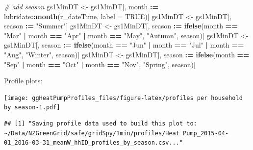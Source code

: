 \documentclass[]{article}
\newenvironment{Shaded}{\begin{snugshade}}{\end{snugshade}}
\newcommand{\KeywordTok}[1]{\textcolor[rgb]{0.13,0.29,0.53}{\textbf{#1}}}
\newcommand{\DataTypeTok}[1]{\textcolor[rgb]{0.13,0.29,0.53}{#1}}
\newcommand{\StringTok}[1]{\textcolor[rgb]{0.31,0.60,0.02}{#1}}
\newcommand{\CommentTok}[1]{\textcolor[rgb]{0.56,0.35,0.01}{\textit{#1}}}
\newcommand{\OtherTok}[1]{\textcolor[rgb]{0.56,0.35,0.01}{#1}}
\newcommand{\OperatorTok}[1]{\textcolor[rgb]{0.81,0.36,0.00}{\textbf{#1}}}
\newcommand{\ErrorTok}[1]{\textcolor[rgb]{0.64,0.00,0.00}{\textbf{#1}}}
\newcommand{\NormalTok}[1]{#1}
\begin{document}
\begin{Shaded}
\begin{Highlighting}[]
\CommentTok{# add season}
\NormalTok{gs1MinDT <-}\StringTok{ }\NormalTok{gs1MinDT[, month }\OperatorTok{:}\ErrorTok{=}\StringTok{ }\NormalTok{lubridate}\OperatorTok{::}\KeywordTok{month}\NormalTok{(r_dateTime, }\DataTypeTok{label =} \OtherTok{TRUE}\NormalTok{)]}
\NormalTok{gs1MinDT <-}\StringTok{ }\NormalTok{gs1MinDT[, season }\OperatorTok{:}\ErrorTok{=}\StringTok{ "Summer"}\NormalTok{]}
\NormalTok{gs1MinDT <-}\StringTok{ }\NormalTok{gs1MinDT[, season }\OperatorTok{:}\ErrorTok{=}\StringTok{ }\KeywordTok{ifelse}\NormalTok{(month }\OperatorTok{==}\StringTok{ "Mar"} \OperatorTok{|}
\StringTok{                                              }\NormalTok{month }\OperatorTok{==}\StringTok{ "Apr"} \OperatorTok{|}
\StringTok{                                              }\NormalTok{month }\OperatorTok{==}\StringTok{ "May"}\NormalTok{, }\StringTok{"Autumn"}\NormalTok{, season)]}
\NormalTok{gs1MinDT <-}\StringTok{ }\NormalTok{gs1MinDT[, season }\OperatorTok{:}\ErrorTok{=}\StringTok{ }\KeywordTok{ifelse}\NormalTok{(month }\OperatorTok{==}\StringTok{ "Jun"} \OperatorTok{|}
\StringTok{                                              }\NormalTok{month }\OperatorTok{==}\StringTok{ "Jul"} \OperatorTok{|}
\StringTok{                                              }\NormalTok{month }\OperatorTok{==}\StringTok{ "Aug"}\NormalTok{, }\StringTok{"Winter"}\NormalTok{, season)]}
\NormalTok{gs1MinDT <-}\StringTok{ }\NormalTok{gs1MinDT[, season }\OperatorTok{:}\ErrorTok{=}\StringTok{ }\KeywordTok{ifelse}\NormalTok{(month }\OperatorTok{==}\StringTok{ "Sep"} \OperatorTok{|}
\StringTok{                                              }\NormalTok{month }\OperatorTok{==}\StringTok{ "Oct"} \OperatorTok{|}
\StringTok{                                              }\NormalTok{month }\OperatorTok{==}\StringTok{ "Nov"}\NormalTok{, }\StringTok{"Spring"}\NormalTok{, season)]}
\end{Highlighting}
\end{Shaded}

Profile plots:

\texttt{[image: ggHeatPumpProfiles\_files/figure-latex/profiles per household by season-1.pdf]}

\begin{verbatim}
## [1] "Saving profile data used to build this plot to: ~/Data/NZGreenGrid/safe/gridSpy/1min/profiles/Heat Pump_2015-04-01_2016-03-31_meanW_hhID_profiles_by_season.csv..."
\end{verbatim}
\end{document}
